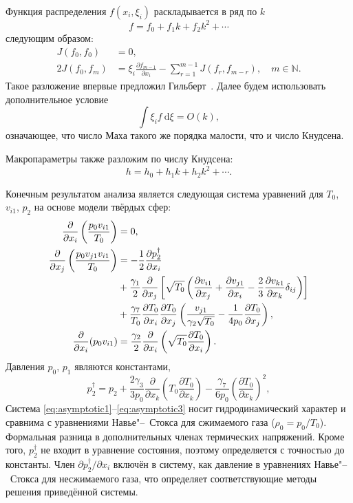 \documentclass[english,russian,a4paper,12pt]{article}
\newcommand{\dd}{\:\mathrm{d}}
\newcommand{\pder}[2][]{\frac{\partial#1}{\partial#2}}
\begin{document}
Функция распределения \(f(x_i,\xi_i)\) раскладывается в ряд по \(k\)
\[ f = f_0 + f_1k + f_2k^2 + \cdots \]
следующим образом:
\begin{align*}
	J(f_0,f_0) &= 0, \\
	2J(f_0,f_m) &= \xi_i\pder[f_{m-1}]{x_i} - \sum\limits_{r=1}^{m-1}J(f_r,f_{m-r}), \quad m \in \mathbb{N}.
\end{align*}
Такое разложение впервые предложил Гильберт~\cite{Hilbert1912}. Далее будем использовать дополнительное условие
\begin{equation}\label{eq:Mach_constraint}
	\int\xi_if\dd\xi = O(k),
\end{equation}
означающее, что число Маха такого же порядка малости, что и число Кнудсена.

Макропараметры также разложим по числу Кнудсена:
\[ h = h_0 + h_1k + h_2k^2 + \cdots. \]

Конечным результатом анализа является следующая система уравнений для \(T_0\), \(v_{i1}\), \(p_2\)
на основе модели твёрдых сфер:
\begin{align}
	\pder{x_i}\left(\frac{p_0v_{i1}}{T_0}\right) &= 0, \label{eq:asymptotic1} \\
	\pder{x_j}\left(\frac{p_0v_{j1}v_{i1}}{T_0}\right) &= -\frac12\pder[p_2^\dag]{x_i} \notag\\
		&+ \frac{\gamma_1}2\pder{x_j}\left[\sqrt{T_0}\left(
			\pder[v_{i1}]{x_j}+\pder[v_{j1}]{x_i}-\frac23\pder[v_{k1}]{x_k}\delta_{ij}\right
		)\right] \notag\\
		&+ \frac{\gamma_7}{T_0}\pder[T_0]{x_i}\pder[T_0]{x_j}\left(
			\frac{v_{j1}}{\gamma_2\sqrt{T_0}} - \frac1{4p_0}\pder[T_0]{x_j}
		\right), \label{eq:asymptotic2} \\
	\pder{x_i}(p_0v_{i1}) &= \frac{\gamma_2}2\pder{x_i}\left(
		\sqrt{T_0}\pder[T_0]{x_i}
	\right). \label{eq:asymptotic3}
\end{align}
Давления \(p_0\), \(p_1\) являются константами,
\[ 
	p_2^\dag = p_2 + 
		\frac{2\gamma_3}{3p_0}\pder{x_k}\left(T_0\pder[T_0]{x_k}\right) -
		\frac{\gamma_7}{6p_0}\left(\pder[T_0]{x_k}\right)^2,
\]
Система \eqref{eq:asymptotic1}--\eqref{eq:asymptotic3} носит гидродинамический характер
и сравнима с уравнениями Навье"--~Стокса для сжимаемого газа (\(\rho_0 = p_0/T_0\)).
Формальная разница в дополнительных членах термических напряжений.
Кроме того, \(p_2^\dag\) не входит в уравнение состояния, поэтому определяется с точностью до константы.
Член \(\partial{p_2^\dag}/\partial{x_i}\) включён в систему,
как давление в уравнениях Навье"--~Стокса для несжимаемого газа,
что определяет соответствующие методы решения приведённой системы.
\end{document}

